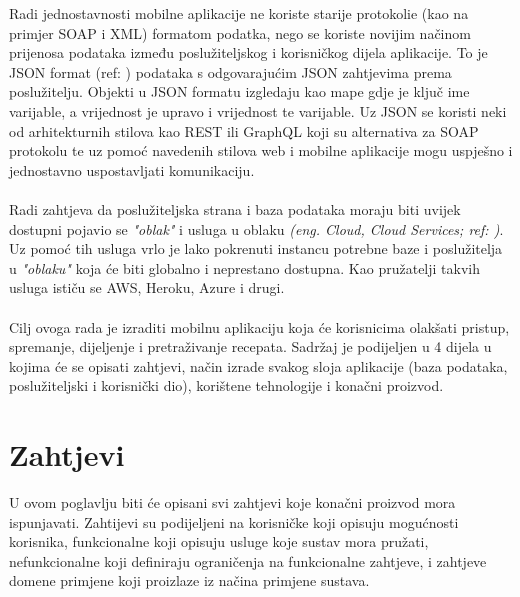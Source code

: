 \documentclass[times, utf8, zavrsni]{fer}
\begin{document}
Radi jednostavnosti mobilne aplikacije ne koriste starije protokolie (kao na primjer
SOAP i XML) formatom podatka, nego se koriste novijim načinom prijenosa
podataka između poslužiteljskog i korisničkog dijela aplikacije.
To je JSON format (ref: \cite{json}) podataka s odgovarajućim JSON zahtjevima prema poslužitelju.
Objekti u JSON formatu izgledaju kao mape gdje je ključ ime varijable, a vrijednost je
upravo i vrijednost te varijable.
Uz JSON se koristi neki od arhitekturnih stilova kao REST ili GraphQL koji su alternativa
za SOAP protokolu te uz pomoć navedenih stilova web i mobilne aplikacije mogu uspješno i jednostavno uspostavljati komunikaciju.
\\\\
Radi zahtjeva da poslužiteljska strana i baza podataka moraju biti uvijek dostupni
pojavio se \textit{"oblak"} i usluga u oblaku \textit{(eng. Cloud, Cloud Services; ref: \cite{CloudServices})}.
Uz pomoć tih usluga vrlo je lako pokrenuti instancu potrebne baze i poslužitelja
u \textit{"oblaku"} koja će biti globalno i neprestano dostupna. Kao pružatelji takvih usluga ističu se
AWS, Heroku, Azure i drugi.
\\\\
Cilj ovoga rada je izraditi mobilnu aplikaciju koja će korisnicima olakšati pristup,
spremanje, dijeljenje i pretraživanje recepata. Sadržaj je podijeljen u 4 dijela u kojima
će se opisati zahtjevi, način izrade svakog sloja aplikacije (baza podataka,
poslužiteljski i korisnički dio), korištene tehnologije i konačni proizvod.

\chapter{Zahtjevi}
U ovom poglavlju biti će opisani svi zahtjevi koje konačni proizvod
mora ispunjavati. Zahtijevi su podijeljeni na korisničke koji opisuju mogućnosti
korisnika, funkcionalne koji opisuju usluge koje sustav mora pružati, nefunkcionalne koji
definiraju ograničenja na funkcionalne zahtjeve,
i zahtjeve domene primjene koji proizlaze iz načina primjene sustava.
\end{document}
